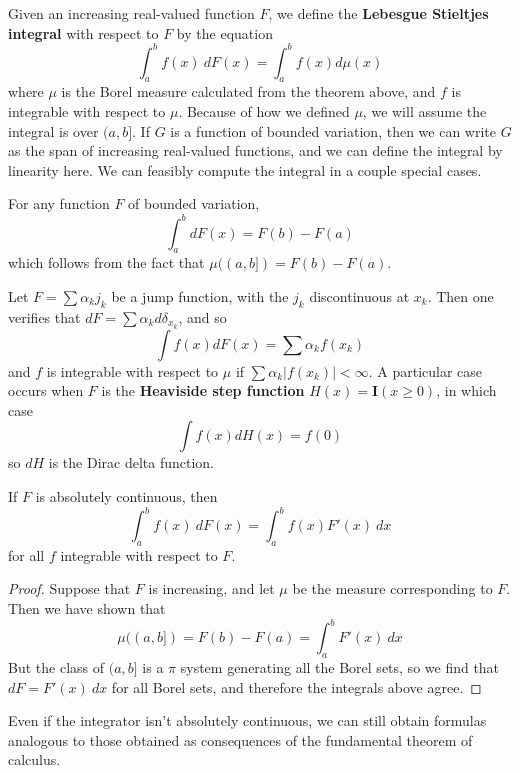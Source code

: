 Given an increasing real-valued function $F$, we define the {\bf Lebesgue Stieltjes integral} with respect to $F$ by the equation
%
\[ \int_a^b f(x)\ dF(x) = \int_a^b f(x) d\mu(x) \]
%
where $\mu$ is the Borel measure calculated from the theorem above, and $f$ is integrable with respect to $\mu$. Because of how we defined $\mu$, we will assume the integral is over $(a,b]$. If $G$ is a function of bounded variation, then we can write $G$ as the span of increasing real-valued functions, and we can define the integral by linearity here. We can feasibly compute the integral in a couple special cases.

\begin{example}
    For any function $F$ of bounded variation,
    \[ \int_a^b dF(x) = F(b) - F(a) \]
    which follows from the fact that $\mu((a,b]) = F(b) - F(a)$.
\end{example}

\begin{example}
    Let $F = \sum \alpha_k j_k$ be a jump function, with the $j_k$ discontinuous at $x_k$. Then one verifies that $dF = \sum \alpha_k d \delta_{x_k}$, and so
    \[ \int f(x) dF(x) = \sum \alpha_k f(x_k) \]
    and $f$ is integrable with respect to $\mu$ if $\sum \alpha_k |f(x_k)| < \infty$. A particular case occurs when $F$ is the {\bf Heaviside step function} $H(x) = \mathbf{I}(x \geq 0)$, in which case
    \[ \int f(x) dH(x) = f(0) \]
    so $dH$ is the Dirac delta function.
\end{example}

\begin{theorem}
    If $F$ is absolutely continuous, then
    \[ \int_a^b f(x)\ dF(x) = \int_a^b f(x) F'(x)\ dx \]
    for all $f$ integrable with respect to $F$.
\end{theorem}
\begin{proof}
    Suppose that $F$ is increasing, and let $\mu$ be the measure corresponding to $F$. Then we have shown that
    \[ \mu((a,b]) = F(b) - F(a) = \int_a^b F'(x)\ dx \]
    But the class of $(a,b]$ is a $\pi$ system generating all the Borel sets, so we find that $dF = F'(x)\ dx$ for all Borel sets, and therefore the integrals above agree.
\end{proof}

Even if the integrator isn't absolutely continuous, we can still obtain formulas analogous to those obtained as consequences of the fundamental theorem of calculus.

